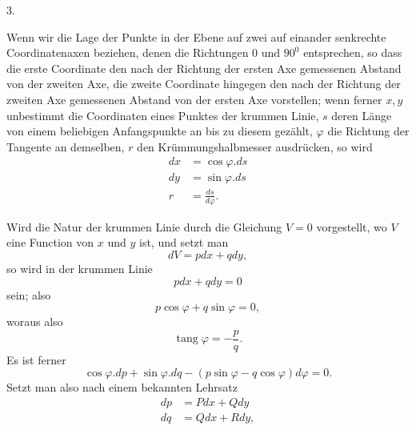 \par{}%
\begin{center}3.\end{center}
\noindent\hspace*{1.2em}Wenn wir die Lage der Punkte in der Ebene auf zwei auf einander senkrechte Coordinatenaxen beziehen, denen die Richtungen $0$ und $90^{0}$ entsprechen, so dass die erste Coordinate den nach der Richtung der ersten Axe gemessenen Abstand von der zweiten Axe, die zweite Coordinate hingegen den nach der Richtung der zweiten Axe gemessenen Abstand von der ersten Axe vorstellen; wenn ferner $x,y$ unbestimmt die Coordinaten eines Punktes der krummen Linie, $s$ deren Länge von einem beliebigen Anfangspunkte an bis zu diesem gezählt, $\varphi$ die Richtung der Tangente an demselben, $r$ den Krümmungshalbmesser ausdrücken, so wird
\[
\begin{aligned}
dx&=\cos\varphi.ds\\
dy&=\sin\varphi.ds\\
r&=\frac{ds}{d\varphi}.
\end{aligned}
\]

Wird die Natur der krummen Linie durch die Gleichung $V=0$ vorgestellt, wo $V$ eine Function von $x$ und $y$ ist, und setzt man
\[
dV=pdx+qdy,
\]
so wird in der krummen Linie
\[
pdx+qdy=0
\]
sein; also
\[
p\cos\varphi+q\sin\varphi=0,
\]
woraus also
\[
\operatorname{tang}\varphi=-\frac pq.
\]
Es ist ferner
\[
\cos\varphi.dp+\sin\varphi.dq-(p\sin\varphi-q\cos\varphi)d\varphi=0.
\]
Setzt man also nach einem bekannten Lehrsatz
\[
\begin{aligned}
dp&=Pdx+Qdy\\
dq&=Qdx+Rdy,
\end{aligned}
\]
